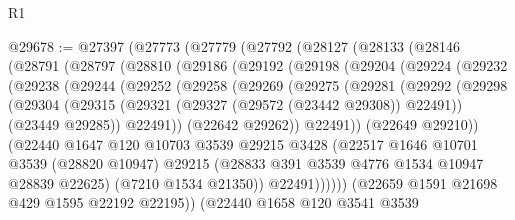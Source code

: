 \begin{lexlean}{R1}
\begin{coremodule}
@29678 := @27397
    (@27773
      (@27779
        (@27792
          (@28127
            (@28133
              (@28146
                (@28791
                  (@28797
                    (@28810
                      (@29186
                        (@29192
                          (@29198
                            (@29204
                              (@29224
                                (@29232
                                  (@29238
                                    (@29244
                                      (@29252
                                        (@29258
                                          (@29269
                                            (@29275
                                              (@29281
                                                (@29292
                                                  (@29298
                                                    (@29304
                                                      (@29315
                                                        (@29321
                                                          (@29327 (@29572 (@23442 @29308)) @22491))
                                                        (@23449 @29285))
                                                      @22491))
                                                  (@22642 @29262))
                                                @22491))
                                            (@22649 @29210))
                                          (@22440
                                            @1647
                                            @120
                                            @10703
                                            @3539
                                            @29215
                                            @3428
                                            (@22517
                                              @1646
                                              @10701
                                              @3539
                                              (@28820 @10947)
                                              @29215
                                              (@28833 @391 @3539 @4776 @1534 @10947 @28839 @22625)
                                              (@7210 @1534 @21350))
                                            @22491))))))
                                (@22659 @1591 @21698 @429 @1595 @22192 @22195))
                              (@22440
                                @1658
                                @120
                                @3541
                                @3539

\end{coremodule}
\end{lexlean}

